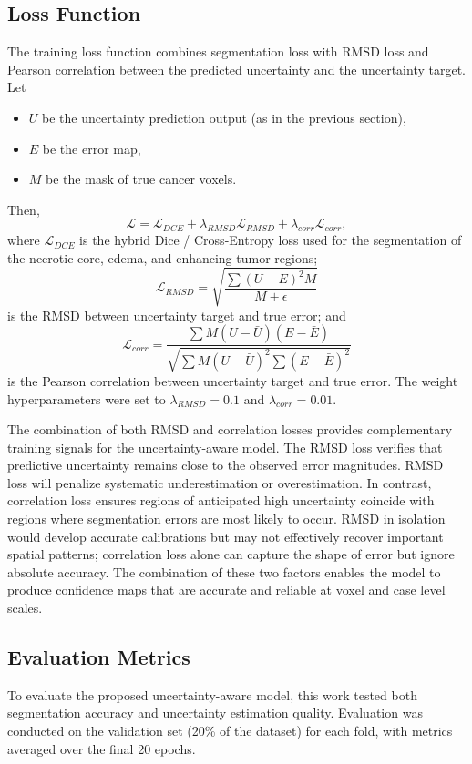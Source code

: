 \documentclass[11pt,letterpaper]{article}
\begin{document}
\subsection{Loss Function}
The training loss function combines segmentation loss with RMSD loss and Pearson correlation between the predicted uncertainty and the uncertainty target. Let
\begin{itemize}
    \item $U$ be the uncertainty prediction output (as in the previous section),
    \item $E$ be the error map,
    \item $M$ be the mask of true cancer voxels.
\end{itemize}
Then,
\begin{equation}
\mathcal{L} = \mathcal{L}_{DCE} + \lambda_{RMSD} \mathcal{L}_{RMSD}+ \lambda_{corr} \mathcal{L}_{corr},
\end{equation}
where $\mathcal{L}_{DCE}$ is the hybrid Dice / Cross-Entropy loss used for the segmentation of the necrotic core, edema, and enhancing tumor regions;
\begin{equation}
\mathcal{L}_{RMSD} = \sqrt{\frac{\sum (U-E)^2M}{M + \epsilon}}
\end{equation}
is the RMSD between uncertainty target and true error; and
\begin{equation}
\mathcal{L}_{corr} = \frac{\sum M (U - \bar{U})(E-\bar{E})}{\sqrt{\sum M(U - \bar{U})^2 \sum (E - \bar{E})^2}}
\end{equation}
is the Pearson correlation between uncertainty target and true error. The weight hyperparameters were set to $\lambda_{RMSD} = 0.1$ and $\lambda_{corr} = 0.01$.

The combination of both RMSD and correlation losses provides complementary training signals for the uncertainty-aware model. The RMSD loss verifies that predictive uncertainty remains close to the observed error magnitudes. RMSD loss will penalize systematic underestimation or overestimation. In contrast, correlation loss ensures regions of anticipated high uncertainty coincide with regions where segmentation errors are most likely to occur. RMSD in isolation would develop accurate calibrations but may not effectively recover important spatial patterns; correlation loss alone can capture the shape of error but ignore absolute accuracy. The combination of these two factors enables the model to produce confidence maps that are accurate and reliable at voxel and case level scales.

\subsection{Evaluation Metrics}
To evaluate the proposed uncertainty-aware model, this work tested both segmentation accuracy and uncertainty estimation quality. Evaluation was conducted on the validation set (20\% of the dataset) for each fold, with metrics averaged over the final 20 epochs.
\end{document}

